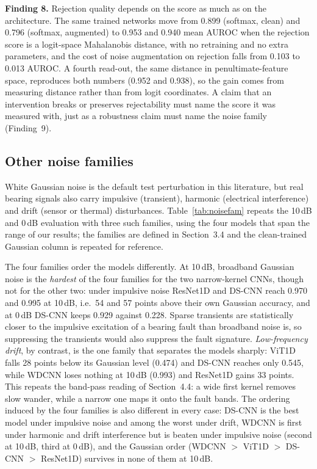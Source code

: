 \textbf{Finding 8.} Rejection quality depends on the score as much as on the architecture. The same trained networks move from 0.899 (softmax, clean) and 0.796 (softmax, augmented) to 0.953 and 0.940 mean AUROC when the rejection score is a logit-space Mahalanobis distance, with no retraining and no extra parameters, and the cost of noise augmentation on rejection falls from 0.103 to 0.013 AUROC. A fourth read-out, the same distance in penultimate-feature space, reproduces both numbers (0.952 and 0.938), so the gain comes from measuring distance rather than from logit coordinates. A claim that an intervention breaks or preserves rejectability must name the score it was measured with, just as a robustness claim must name the noise family (Finding~9).

\subsection{Other noise families}
\label{sec:noisetypes}

White Gaussian noise is the default test perturbation in this literature, but real bearing signals also carry impulsive (transient), harmonic (electrical interference) and drift (sensor or thermal) disturbances. Table~\ref{tab:noisefam} repeats the 10\,dB and 0\,dB evaluation with three such families, using the four models that span the range of our results; the families are defined in Section~3.4 and the clean-trained Gaussian column is repeated for reference.

The four families order the models differently. At 10\,dB, broadband Gaussian noise is the \emph{hardest} of the four families for the two narrow-kernel CNNs, though not for the other two: under impulsive noise ResNet1D and DS-CNN reach 0.970 and 0.995 at 10\,dB, i.e.\ 54 and 57 points above their own Gaussian accuracy, and at 0\,dB DS-CNN keeps 0.929 against 0.228. Sparse transients are statistically closer to the impulsive excitation of a bearing fault than broadband noise is, so suppressing the transients would also suppress the fault signature. \emph{Low-frequency drift}, by contrast, is the one family that separates the models sharply: ViT1D falls 28 points below its Gaussian level (0.474) and DS-CNN reaches only 0.545, while WDCNN loses nothing at 10\,dB (0.993) and ResNet1D gains 33 points. This repeats the band-pass reading of Section~4.4: a wide first kernel removes slow wander, while a narrow one maps it onto the fault bands. The ordering induced by the four families is also different in every case: DS-CNN is the best model under impulsive noise and among the worst under drift, WDCNN is first under harmonic and drift interference but is beaten under impulsive noise (second at 10\,dB, third at 0\,dB), and the Gaussian order (WDCNN $>$ ViT1D $>$ DS-CNN $>$ ResNet1D) survives in none of them at 10\,dB.

